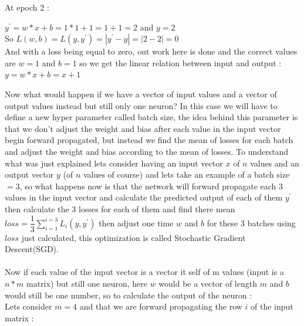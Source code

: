\documentclass[10pt,a4paper]{article}
\begin{document}
At epoch 2 :
\begin{center}
$ y^{\prime} = w*x + b = 1*1 + 1 = 1 + 1 = 2 $ \hspace{5mm} and \hspace{5mm} $ y = 2 $\\
So \hspace{5mm} $ L(w,b) = L(y,y^{\prime}) = |y^{\prime} - y| = |2 - 2| = 0 $\\
And with a loss being equal to zero, out work here is done and the correct values are $ w = 1 $ and $ b = 1 $ so we get the linear relation between input and output : $ y = w*x + b = x + 1 $
\end{center}
Now what would happen if we have a vector of input values and a vector of output values instead but still only one neuron? In this case we will have to define a new hyper parameter called batch size, the idea behind this parameter is that we don't adjust the weight and bias after each value in the input vector begin forward propagated, but instead we find the mean of losses for each batch and adjust the weight and bias according to the mean of losses. To understand what was just explained lets consider having an input vector $ x $ of $ n $ values and an output vector $ y $ (of $ n $ values of course) and lets take an example of a batch size $ = 3 $, so what happens now is that the network will forward propagate each 3 values in the input vector and calculate the predicted output of each of them $ y^{\prime} $ then calculate the 3 losses for each of them and find there mean $ loss = \dfrac{1}{3}\sum_{i=1}^{i=3}L_i(y,y^{\prime}) $ then adjust one time $ w $ and $ b $ for these 3 batches using $ loss $ just calculated, this optimization is called Stochastic Gradient Descent(SGD).\\\\
Now if each value of the input vector is a vector it self of m values (input is a $ n*m $ matrix) but still one neuron, here $ w $ would be a vector of length $ m $ and $ b $ would still be one number, so to calculate the output of the neuron :\\
Lets consider $ m = 4 $ and that we are forward propagating the row $ i $ of the input matrix :\\
\end{document}
